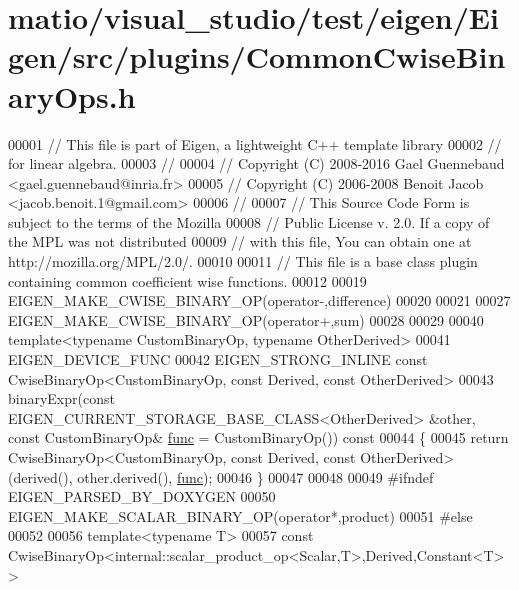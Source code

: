 \hypertarget{matio_2visual__studio_2test_2eigen_2_eigen_2src_2plugins_2_common_cwise_binary_ops_8h_source}{}\section{matio/visual\+\_\+studio/test/eigen/\+Eigen/src/plugins/\+Common\+Cwise\+Binary\+Ops.h}
\label{matio_2visual__studio_2test_2eigen_2_eigen_2src_2plugins_2_common_cwise_binary_ops_8h_source}

\begin{DoxyCode}
00001 \textcolor{comment}{// This file is part of Eigen, a lightweight C++ template library}
00002 \textcolor{comment}{// for linear algebra.}
00003 \textcolor{comment}{//}
00004 \textcolor{comment}{// Copyright (C) 2008-2016 Gael Guennebaud <gael.guennebaud@inria.fr>}
00005 \textcolor{comment}{// Copyright (C) 2006-2008 Benoit Jacob <jacob.benoit.1@gmail.com>}
00006 \textcolor{comment}{//}
00007 \textcolor{comment}{// This Source Code Form is subject to the terms of the Mozilla}
00008 \textcolor{comment}{// Public License v. 2.0. If a copy of the MPL was not distributed}
00009 \textcolor{comment}{// with this file, You can obtain one at http://mozilla.org/MPL/2.0/.}
00010 
00011 \textcolor{comment}{// This file is a base class plugin containing common coefficient wise functions.}
00012 
00019 EIGEN\_MAKE\_CWISE\_BINARY\_OP(\textcolor{keyword}{operator}-,difference)
00020 
00021 
00027 EIGEN\_MAKE\_CWISE\_BINARY\_OP(\textcolor{keyword}{operator}+,sum)
00028 
00029 
00040 \textcolor{keyword}{template}<\textcolor{keyword}{typename} CustomBinaryOp, \textcolor{keyword}{typename} OtherDerived>
00041 EIGEN\_DEVICE\_FUNC
00042 EIGEN\_STRONG\_INLINE \textcolor{keyword}{const} CwiseBinaryOp<CustomBinaryOp, const Derived, const OtherDerived>
00043 binaryExpr(\textcolor{keyword}{const} EIGEN\_CURRENT\_STORAGE\_BASE\_CLASS<OtherDerived> &other, \textcolor{keyword}{const} CustomBinaryOp& 
      \hyperlink{structfunc}{func} = CustomBinaryOp())\textcolor{keyword}{ const}
00044 \textcolor{keyword}{}\{
00045   \textcolor{keywordflow}{return} CwiseBinaryOp<CustomBinaryOp, const Derived, const OtherDerived>(derived(), other.derived(), 
      \hyperlink{structfunc}{func});
00046 \}
00047 
00048 
00049 \textcolor{preprocessor}{#ifndef EIGEN\_PARSED\_BY\_DOXYGEN}
00050 EIGEN\_MAKE\_SCALAR\_BINARY\_OP(\textcolor{keyword}{operator}*,product)
00051 \textcolor{preprocessor}{#else}
00052 
00056 \textcolor{keyword}{template}<\textcolor{keyword}{typename} T>
00057 \textcolor{keyword}{const} CwiseBinaryOp<internal::scalar\_product\_op<Scalar,T>,Derived,Constant<T> > 

\end{DoxyCode}
